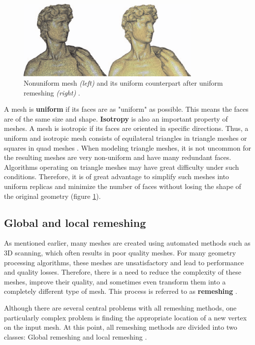 \documentclass{ACGSeminar}
\begin{document}
\begin{figure}[htb!]
	\begin{centering}
		\includegraphics[width=9cm]{img/Uniform-Mesh.png}\par
	\end{centering}
	\caption{Nonuniform mesh \textit{(left)} and its uniform counterpart after uniform remeshing \textit{(right)} \cite{alliez2008recent}.}
	\label{fig:uniform-mesh}
\end{figure}

A mesh is \textbf{uniform} if its faces are as "uniform" as possible. This means the faces are of the same size and shape. \textbf{Isotropy} is also an important property of meshes. A mesh is isotropic if its faces are oriented in specific directions. Thus, a uniform and isotropic mesh consists of equilateral triangles in triangle meshes or squares in quad meshes \cite{alliez2003isotropic,surazhsky2003isotropic}. When modeling triangle meshes, it is not uncommon for the resulting meshes are very non-uniform and have many redundant faces. Algorithms operating on triangle meshes may have great difficulty under such conditions. Therefore, it is of great advantage to simplify such meshes into uniform replicas and minimize the number of faces without losing the shape of the original geometry (figure \ref{fig:uniform-mesh}).


\subsection{Global and local remeshing}\label{global-local-remeshing}
As mentioned earlier, many meshes are created using automated methods such as 3D scanning, which often results in poor quality meshes. For many geometry processing algorithms, these meshes are unsatisfactory and lead to performance and quality losses. Therefore, there is a need to reduce the complexity of these meshes, improve their quality, and sometimes even transform them into a completely different type of mesh. This process is referred to as \textbf{remeshing} \cite{alliez2008recent}.\bigskip

Although there are several central problems with all remeshing methods, one particularly complex problem is finding the appropriate location of a new vertex on the input mesh. At this point, all remeshing methods are divided into two classes: Global remeshing and local remeshing \cite{botsch2007geometric,alliez2008recent}.\bigskip
\end{document}
